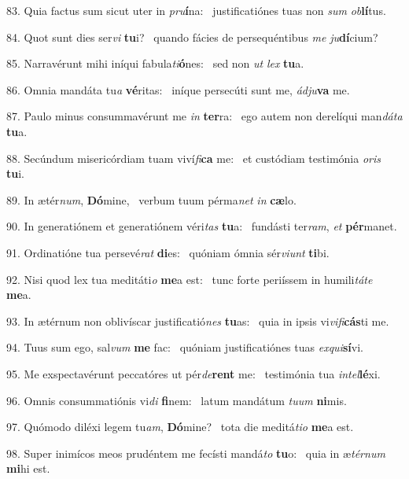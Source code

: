 83. Quia factus sum sicut uter in \textit{pru}\textbf{í}na: \ast\  justificatiónes tuas non \textit{sum} \textit{ob}\textbf{lí}tus.\

84. Quot sunt dies ser\textit{vi} \textbf{tu}i? \ast\  quando fácies de persequéntibus \textit{me} \textit{ju}\textbf{dí}cium?\

85. Narravérunt mihi iníqui fabula\textit{ti}\textbf{ó}nes: \ast\  sed non \textit{ut} \textit{lex} \textbf{tu}a.\

86. Omnia mandáta tu\textit{a} \textbf{vé}ritas: \ast\  iníque persecúti sunt me, \textit{ád}\textit{ju}\textbf{va} me.\

87. Paulo minus consummavérunt me \textit{in} \textbf{ter}ra: \ast\  ego autem non derelíqui man\textit{dá}\textit{ta} \textbf{tu}a.\

88. Secúndum misericórdiam tuam viví\textit{fi}\textbf{ca} me: \ast\  et custódiam testimónia \textit{o}\textit{ris} \textbf{tu}i.\

89. In ætér\textit{num}, \textbf{Dó}mine, \ast\  verbum tuum pérma\textit{net} \textit{in} \textbf{cæ}lo.\

90. In generatiónem et generatiónem véri\textit{tas} \textbf{tu}a: \ast\  fundásti ter\textit{ram}, \textit{et} \textbf{pér}manet.\

91. Ordinatióne tua persevé\textit{rat} \textbf{di}es: \ast\  quóniam ómnia sér\textit{vi}\textit{unt} \textbf{ti}bi.\

92. Nisi quod lex tua meditáti\textit{o} \textbf{me}a est: \ast\  tunc forte periíssem in humili\textit{tá}\textit{te} \textbf{me}a.\

93. In ætérnum non oblivíscar justificatió\textit{nes} \textbf{tu}as: \ast\  quia in ipsis vi\textit{vi}\textit{fi}\textbf{cás}ti me.\

94. Tuus sum ego, sal\textit{vum} \textbf{me} fac: \ast\  quóniam justificatiónes tuas \textit{ex}\textit{qui}\textbf{sí}vi.\

95. Me exspectavérunt peccatóres ut pér\textit{de}\textbf{rent} me: \ast\  testimónia tua \textit{in}\textit{tel}\textbf{lé}xi.\

96. Omnis consummatiónis vi\textit{di} \textbf{fi}nem: \ast\  latum mandátum \textit{tu}\textit{um} \textbf{ni}mis.\

97. Quómodo diléxi legem tu\textit{am}, \textbf{Dó}mine? \ast\  tota die meditá\textit{ti}\textit{o} \textbf{me}a est.\

98. Super inimícos meos prudéntem me fecísti mandá\textit{to} \textbf{tu}o: \ast\  quia in æ\textit{tér}\textit{num} \textbf{mi}hi est.\

